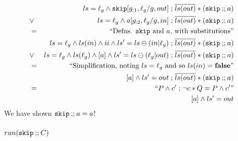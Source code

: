 \begin{eqnarray*}
\\&& ls=\ell_g
     \land \texttt{skip}[g_{:1},\ell_g/g,out] \mathrel{;} \overline{ls(out)} * (\texttt{skip} \mathbin{;\!;} a)
\\&\lor&
     ls=\ell_g
     \land a[g_{:2},\ell_g/g,in] \mathrel{;} \overline{ls(out)} * (\texttt{skip} \mathbin{;\!;} a)
\\&=&\textrm{``Defns.  $\texttt{skip}$ and $a$, with substitutions''}
\\&& ls=\ell_g
     \land ls(in) \land ii \land ls'=ls \ominus (in|\ell_g) \mathrel{;} \overline{ls(out)} * (\texttt{skip} \mathbin{;\!;} a)
\\&\lor&
     ls=\ell_g
     \land ls(\ell_g) \land [a] \land ls'=ls \ominus (\ell_g|out) \mathrel{;} \overline{ls(out)} * (\texttt{skip} \mathbin{;\!;} a)
\\&=&\textrm{``Simplification, noting $ls=\ell_g$ and so $ls(in) = \mathbf{false}$''}
\\&& [a] \land ls'=out \mathrel{;} \overline{ls(out)} * (\texttt{skip} \mathbin{;\!;} a)
\\&=&\textrm{``$P \land c' \mathrel{;} \lnot c * Q = P \land c'$''}
\\&& [a] \land ls'=out
\end{eqnarray*}
We have shown $\texttt{skip} \mathbin{;\!;} a = a$!

\subsubsection{$run(\texttt{skip} \mathbin{;\!;} C)$}

